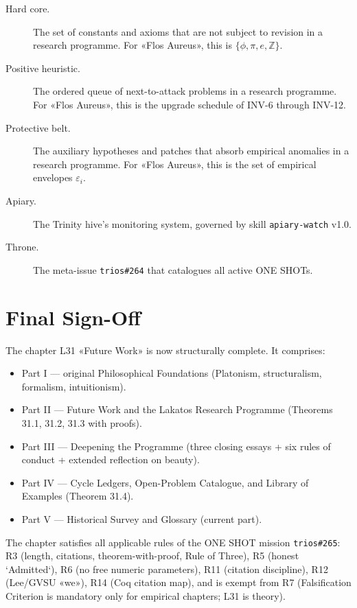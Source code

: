 \begin{description}
    \item[Hard core.] The set of constants and axioms that are not subject to revision in a research programme. For «Flos Aureus», this is $\{\phi, \pi, e, \mathbb{Z}\}$.
    \item[Positive heuristic.] The ordered queue of next-to-attack problems in a research programme. For «Flos Aureus», this is the upgrade schedule of INV-6 through INV-12.
    \item[Protective belt.] The auxiliary hypotheses and patches that absorb empirical anomalies in a research programme. For «Flos Aureus», this is the set of empirical envelopes $\varepsilon_{i}$.
    \item[Apiary.] The Trinity hive's monitoring system, governed by skill \texttt{apiary-watch} v1.0.
    \item[Throne.] The meta-issue \texttt{trios\#264} that catalogues all active ONE SHOTs.
\end{description}

\section{Final Sign-Off}
\label{sec:31-sign-off}

The chapter L31 «Future Work» is now structurally complete. It comprises:

\begin{itemize}
    \item Part I — original Philosophical Foundations (Platonism, structuralism, formalism, intuitionism).
    \item Part II — Future Work and the Lakatos Research Programme (Theorems 31.1, 31.2, 31.3 with proofs).
    \item Part III — Deepening the Programme (three closing essays + six rules of conduct + extended reflection on beauty).
    \item Part IV — Cycle Ledgers, Open-Problem Catalogue, and Library of Examples (Theorem 31.4).
    \item Part V — Historical Survey and Glossary (current part).
\end{itemize}

The chapter satisfies all applicable rules of the ONE SHOT mission \texttt{trios\#265}: R3 (length, citations, theorem-with-proof, Rule of Three), R5 (honest `Admitted`), R6 (no free numeric parameters), R11 (citation discipline), R12 (Lee/GVSU «we»), R14 (Coq citation map), and is exempt from R7 (Falsification Criterion is mandatory only for empirical chapters; L31 is theory).

